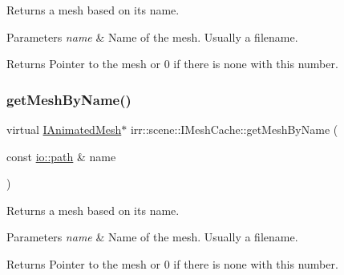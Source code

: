 Returns a mesh based on its name. 


\begin{DoxyParams}{Parameters}
{\em name} & Name of the mesh. Usually a filename. \\
\hline
\end{DoxyParams}
\begin{DoxyReturn}{Returns}
Pointer to the mesh or 0 if there is none with this number. 
\end{DoxyReturn}
\mbox{\label{classirr_1_1scene_1_1IMeshCache_a4c93e736bdca8c84d478afc82540d6bb}} 
\subsubsection{\texorpdfstring{get\+Mesh\+By\+Name()}{getMeshByName()}\hspace{0.1cm}{\footnotesize\ttfamily [2/2]}}
{\footnotesize\ttfamily virtual \hyperlink{classirr_1_1scene_1_1IAnimatedMesh}{I\+Animated\+Mesh}$\ast$ irr\+::scene\+::\+I\+Mesh\+Cache\+::get\+Mesh\+By\+Name (\begin{DoxyParamCaption}\item[{const \hyperlink{namespaceirr_1_1io_a6468281622ce3a1c46b72e19f32dded5}{io\+::path} \&}]{name }\end{DoxyParamCaption})\hspace{0.3cm}{\ttfamily [pure virtual]}}



Returns a mesh based on its name. 


\begin{DoxyParams}{Parameters}
{\em name} & Name of the mesh. Usually a filename. \\
\hline
\end{DoxyParams}
\begin{DoxyReturn}{Returns}
Pointer to the mesh or 0 if there is none with this number. 
\end{DoxyReturn}
\mbox{\label{classirr_1_1scene_1_1IMeshCache_a9dc99e46309a6ef494ef7672c9b49853}} 
